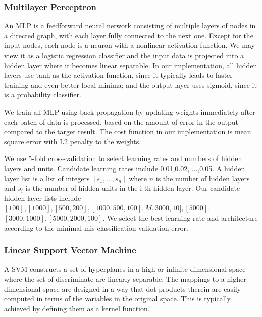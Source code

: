 \documentclass{acm_proc_article-sp}
\begin{document}
\subsubsection{Multilayer Perceptron}
An MLP is a feedforward neural network consisting of multiple layers of nodes in a directed graph, with each layer fully connected to the next one. Except for the input nodes, each node is a neuron with a nonlinear activation function. We may view it as a logistic regression classifier and the input data is projected into a hidden layer where it becomes linear separable. In our implementation, all hidden layers use tanh as the activation function, since it typically leads to faster training and even better local minima; and the output layer uses sigmoid, since it is a probability classifier.

We train all MLP using back-propagation\cite{rumelhart1986learning} by updating weights immediately after each batch of data is processed, based on the amount of error in the output compared to the target result. The cost function in our implementation is mean square error with L2 penalty to the weights.

We use 5-fold cross-validation to select learning rates and numbers of hidden layers and units. Candidate learning rates include 0.01,0.02, ...,0.05. A hidden layer list is a list of integers $[s_1,...,s_n]$ where $n$ is the number of hidden layers and $s_i$ is the number of hidden units in the i-th hidden layer. Our candidate hidden layer lists include $[100],[1000],[500,200],[1000,500,100],M,3000,10], [5000],$ \\$[3000,1000],[5000,2000,100]$. We select the best learning rate and architecture according to the minimal mis-classification validation error.

\subsubsection{Linear Support Vector Machine }
A SVM \cite{pineaul13} constructs a set of hyperplanes in a high or infinite dimensional space where the set of discriminate are linearly separable. The mappings to a higher dimensional space are designed in a way that dot products therein are easily computed in terms of the variables in the original space. This is typically achieved by defining them as a kernel function.
\end{document}
